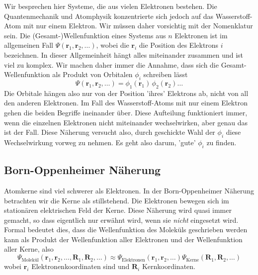 Wir besprechen hier Systeme, die  aus vielen Elektronen bestehen. Die Quantenmechanik und Atomphysik konzentrierte sich jedoch auf das Wasserstoff-Atom mit nur einem Elektron. Wir müssen daher vorsichtig mit der Nomenklatur sein. Die (Gesamt-)Wellenfunktion eines Systems aus $n$ Elektronen ist im allgemeinen Fall $\Psi(\mathbf{r}_1, \mathbf{r}_2, \dots)$, wobei die $\mathbf{r}_i$ die Position des Elektrons $i$ bezeichnen. In dieser Allgemeinheit hängt alles miteinander zusammen und ist viel zu komplex. Wir machen daher immer die Annahme, dass sich die Gesamt-Wellenfunktion als Produkt von Orbitalen $\phi_i$ schreiben lässt
\begin{equation}
\Psi(\mathbf{r}_1, \mathbf{r}_2, \dots) = \phi_1(\mathbf{r}_1) \, \phi_2(\mathbf{r}_2)  \dots
\end{equation}
Die Orbitale hängen also nur von der Position 'ihres' Elektrons ab, nicht von all den anderen Elektronen. Im Fall des Wasserstoff-Atoms mit nur einem Elektron gehen die beiden Begriffe ineinander über.
Diese Aufteilung funktioniert immer, wenn die einzelnen Elektronen nicht miteinander wechselwirken, aber genau das ist der Fall. Diese Näherung versucht also, durch geschickte Wahl der $\phi_i$ diese Wechselwirkung vorweg zu nehmen. Es geht also darum, 'gute' $\phi_i$ zu finden.

\subsection{Born-Oppenheimer Näherung}

Atomkerne sind viel schwerer als Elektronen. In der Born-Oppenheimer Näherung betrachten wir die Kerne als stillstehend. Die Elektronen bewegen sich im stationären elektrischen Feld der Kerne. Diese Näherung wird quasi immer gemacht, so dass eigentlich nur erwähnt wird, wenn sie \emph{nicht} eingesetzt wird. Formal bedeutet dies, dass die Wellenfunktion des Moleküls geschrieben werden kann als Produkt der Wellenfunktion aller Elektronen und der Wellenfunktion aller Kerne, also
\begin{equation}
\Psi_{\text{Molekül}}(\mathbf{r}_1, \mathbf{r}_2, \dots, \mathbf{R}_1, \mathbf{R}_2, \dots)
  \approx
  \Psi_{\text{Elektronen}}(\mathbf{r}_1, \mathbf{r}_2, \dots )
\Psi_{\text{Kerne}}( \mathbf{R}_1, \mathbf{R}_2, \dots)
\end{equation}
wobei $\mathbf{r}_i$ Elektronenkoordinaten sind und $\mathbf{R}_i$ Kernkoordinaten.




